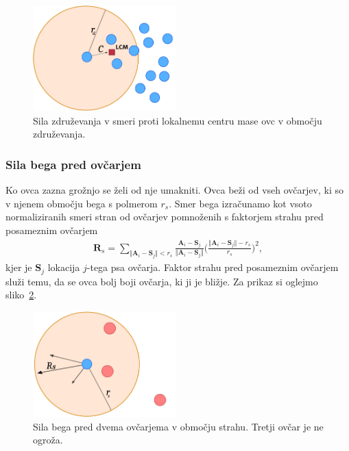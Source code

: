 \begin{figure}[ht]  %
	\centering
	\includegraphics[width=0.49\textwidth]{../poglavja/images/stroembom_zblizevanje.pdf}
	\caption[Sila združevanja]{Sila združevanja v smeri proti lokalnemu centru mase ovc v območju združevanja.} %
	\label{fig:stroembom-zdruzi}
\end{figure}

\subsubsection{Sila bega pred ovčarjem}

Ko ovca zazna grožnjo se želi od nje umakniti. Ovca beži od vseh ovčarjev, ki so v njenem območju bega s polmerom $r_s$. Smer bega izračunamo kot vsoto normaliziranih smeri stran od ovčarjev pomnoženih s faktorjem strahu pred posameznim ovčarjem
\begin{align}
\mathbf{R}_s = \sum_{\Vert \mathbf{A}_i - \mathbf{S}_j\Vert < r_s}\frac{ \mathbf{A}_i - \mathbf{S}_j}{\Vert \mathbf{A}_i - \mathbf{S}_j\Vert}\Big(\frac{ \Vert \mathbf{A}_i - \mathbf{S}_j\Vert - r_s}{r_s}\Big)^2, \label{eq:stroembom-beg}
\end{align}
kjer je $\mathbf{S}_j$ lokacija $j$-tega psa ovčarja. Faktor strahu pred posameznim ovčarjem služi temu, da se ovca bolj boji ovčarja, ki ji je bližje. Za prikaz si oglejmo sliko~\ref{fig:stroembom-beg}.

\begin{figure}[ht]  %
	\centering
	\includegraphics[width=0.49\textwidth]{../poglavja/images/stroembom_beg.pdf}
	\caption[Sila bega pred ovčarjem]{Sila bega pred dvema ovčarjema v območju strahu. Tretji ovčar je ne ogroža.} %
	\label{fig:stroembom-beg}
\end{figure}

